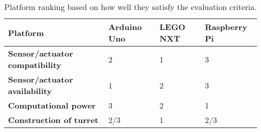 \begin{table}[H]
\centering
\begin{tabular}{|l|l|l|l|}
\hline
\textbf{Platform} & \textbf{Arduino Uno} & \textbf{LEGO NXT} & \textbf{Raspberry Pi} \\ 
\hline
\textbf{Sensor/actuator compatibility} & 2 & 1 & 3 \\ 
\hline
\textbf{Sensor/actuator availability} & 1 & 2  & 3 \\ 
\hline
\textbf{Computational power} & 3 & 2 & 1 \\ 
\hline
\textbf{Construction of turret} & 2/3 & 1 & 2/3 \\ 
\hline
\end{tabular}
\caption{Platform ranking based on how well they satisfy the evaluation criteria.}
\label{tab:criteria}
\end{table}
\FloatBarrier